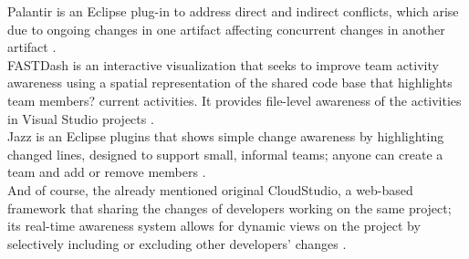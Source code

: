 Palantir is an Eclipse plug-in to address direct and indirect conflicts, which arise due to ongoing changes in one artifact affecting concurrent changes in another artifact \cite{ref22}. \\

FASTDash is an interactive visualization that seeks to improve team activity awareness using a spatial representation of the shared code base that highlights team members? current activities. It provides file-level awareness of the activities in Visual Studio projects \cite{ref26}. \\

Jazz is an Eclipse plugins that shows simple change awareness by highlighting changed lines, designed to support small, informal teams; anyone can create a team and add or remove members \cite{ref27}. \\

And of course, the already mentioned original CloudStudio, a web-based framework that sharing the changes of developers working on the same project; its real-time awareness system allows for dynamic views on the project by selectively including or excluding other developers' changes \cite{ref12}.



